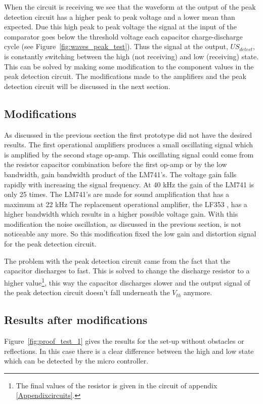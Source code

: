 When the circuit is receiving we see that the waveform at the output of the peak detection circuit has a higher peak to peak voltage and a lower mean than expected.
Due this high peak to peak voltage the signal at the input of the comparator goes below the threshold voltage each capacitor charge-discharge cycle (see Figure~\ref{fig:waves_peak_test}).
Thus the signal at the output, $US_{detect}$, is constantly switching between the high (not receiving) and low (receiving) state.
This can be solved by making some modification to the component values in the peak detection circuit.
The modifications made to the amplifiers and the peak detection circuit will be discussed in the next section.


\subsection{Modifications}
\label{chap:mod}
As discussed in the previous section the first prototype did not have the desired results. The first operational amplifiers produces a small oscillating signal which is amplified by the second stage op-amp. This oscillating signal could come from the resistor capacitor combination before the first op-amp or by the low bandwidth, gain bandwidth product of the LM741's. The voltage gain falls rapidly with increasing the signal frequency. At 40 kHz the gain of the LM741 is only 25 times. The LM741's are made for sound amplification that has a maximum at 22 kHz The replacement operational amplifier, the LF353 \cite{LF353}, has a higher bandwidth which results in a higher possible voltage gain. With this modification the noise oscillation, as discussed in the previous section, is not noticeable any more. So this modification fixed the low gain and distortion signal for the peak detection circuit.

The problem with the peak detection circuit came from the fact that the capacitor discharges to fast. This is solved to change the discharge resistor to a higher value\footnote{The final values of the resistor is given in the circuit of appendix \ref{Appendixcircuits}.}, this way the capacitor discharges slower and the output signal of the peak detection circuit doesn't fall underneath the $V_{th}$ anymore.


\subsection{Results after modifications}

Figure~\ref{fig:proof_test_1} gives the results for the set-up without obstacles or reflections.
In this case there is a clear difference between the high and low state which can be detected by the micro controller.

